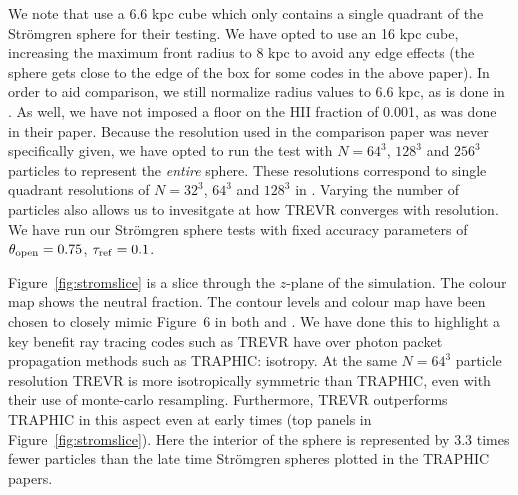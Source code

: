 \documentclass[fleq,usenatbib]{mnras}
\newcommand{\acro}{TREVR}
\newcommand{\tO}{\theta_{\rm open}}
\newcommand{\strom}{Str\"omgren}
\begin{document}
{We note that \cite{ilievEt06} use a 6.6 kpc cube which only contains a single
quadrant of the \strom{} sphere for their testing. We have opted to use an 16 
kpc cube, increasing the maximum front radius to 8 kpc to avoid any edge 
effects (the sphere gets close to the edge of the box for some codes in 
the above paper). In order to aid comparison, we still normalize radius values 
to 6.6 kpc, as is done in \cite{ilievEt06}. As well, we have not imposed a 
floor on the HII fraction of 0.001, as was done in their paper. Because the 
resolution used in the \cite{ilievEt06} comparison paper was never 
specifically given, we have opted to run the test with $N = 64^3$, $128^3$ and 
$256^3$ particles to represent the \textit{entire} sphere. These resolutions 
correspond to single quadrant resolutions of $N=32^3$, $64^3$ and $128^3$ in 
\cite{ilievEt06}. Varying the number of particles also allows us to invesitgate
at how \acro{} converges with resolution. We have run our \strom{} sphere 
tests with fixed accuracy parameters of $\tO = 0.75$, 
$\tau_{\rm ref} = 0.1$.

Figure~\ref{fig:stromslice} is a slice through the $z$-plane of the 
simulation. The colour map shows the neutral fraction. The contour 
levels and colour map have been chosen to closely mimic Figure~6 in both 
\cite{pawlikSchaye08} and \cite{pawlikSchaye11}. We have done this to 
highlight a key benefit ray tracing codes such as \acro{} have over photon 
packet propagation methods such as TRAPHIC: isotropy. At the same $N=64^3$ 
particle resolution \acro{} is more isotropically symmetric than TRAPHIC, even 
with their use of monte-carlo resampling. Furthermore, \acro{} outperforms 
TRAPHIC in this aspect even at early times (top panels in 
Figure~\ref{fig:stromslice}). Here the interior of the sphere is represented 
by 3.3 times fewer particles than the late time \strom{} spheres plotted in 
the TRAPHIC papers.

}
\end{document}
